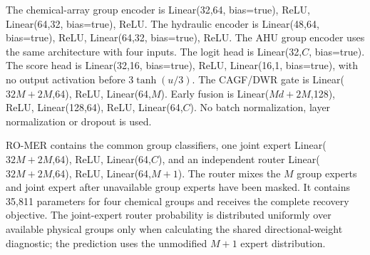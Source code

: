 \documentclass[10pt]{article}
\begin{document}
\begin{table}[ht]
\centering
\caption{Eligibility of chemical training observations for the removal-dependent recovery loss. Values summarize 10 fixed training-mask realizations.}
\resizebox{0.72\textwidth}{!}{}
\end{table}

The chemical-array group encoder is Linear(32,64, bias=true), ReLU, Linear(64,32, bias=true), ReLU. The hydraulic encoder is Linear(48,64, bias=true), ReLU, Linear(64,32, bias=true), ReLU. The AHU group encoder uses the same architecture with four inputs. The logit head is Linear(32,$C$, bias=true). The score head is Linear(32,16, bias=true), ReLU, Linear(16,1, bias=true), with no output activation before $3\tanh(u/3)$. The CAGF/DWR gate is Linear($32M+2M$,64), ReLU, Linear(64,$M$). Early fusion is Linear($Md+2M$,128), ReLU, Linear(128,64), ReLU, Linear(64,$C$). No batch normalization, layer normalization or dropout is used.

\begin{table}[ht]
\centering
\caption{Empirical bounded-response audit. The reported 3.000000 faulted maximum is a stored float32 value after rounding; the real-arithmetic tanh transformation remains inside the open interval.}
\resizebox{0.72\textwidth}{!}{}
\end{table}

RO-MER contains the common group classifiers, one joint expert Linear($32M+2M$,64), ReLU, Linear(64,$C$), and an independent router Linear($32M+2M$,64), ReLU, Linear(64,$M+1$). The router mixes the $M$ group experts and joint expert after unavailable group experts have been masked. It contains 35,811 parameters for four chemical groups and receives the complete recovery objective. The joint-expert router probability is distributed uniformly over available physical groups only when calculating the shared directional-weight diagnostic; the prediction uses the unmodified $M+1$ expert distribution.

\begin{table}[ht]
\centering
\caption{Separate architecture-control estimand. Strict fault-applied-and-available macro-AUROC values are means $\pm$ standard deviations across 10 matched optimization seeds. RO-MER includes group experts and a joint expert; all four mechanisms remain controlled interventions on one instrument.}
\label{tab:supp-major9-modern}
\resizebox{0.82\textwidth}{!}{}
\end{table}
\end{document}

